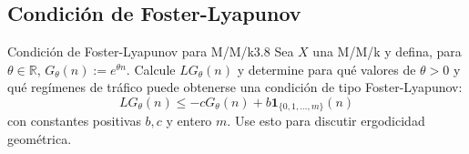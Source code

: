 \documentclass[10pt,a4paper]{article}
\begin{document}
\newpage
\subsection{Condición de Foster-Lyapunov}

\begin{ejercicio}{Condición de Foster-Lyapunov para M/M/k}{3.8}
    Sea $X$ una M/M/k y defina, para $\theta \in \mathbb{R}$, $G_\theta(n) := e^{\theta n}$. Calcule $L G_\theta(n)$ y determine para qué valores de $\theta > 0$ y qué regímenes de tráfico puede obtenerse una condición de tipo Foster-Lyapunov:
    \[ L G_\theta(n) \le -c G_\theta(n) + b \mathbf{1}_{\{0,1,\dots,m\}}(n) \]
    con constantes positivas $b, c$ y entero $m$. Use esto para discutir ergodicidad geométrica.
\end{ejercicio}
\end{document}
